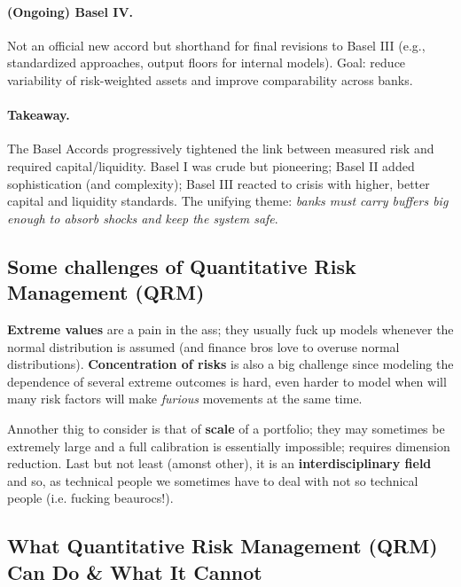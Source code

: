 \paragraph{(Ongoing) Basel IV.}
Not an official new accord but shorthand for final revisions to Basel III (e.g., standardized approaches, output floors for internal models). Goal: reduce variability of risk-weighted assets and improve comparability across banks.

\paragraph{Takeaway.}
The Basel Accords progressively tightened the link between measured risk and required capital/liquidity. Basel I was crude but pioneering; Basel II added sophistication (and complexity); Basel III reacted to crisis with higher, better capital and liquidity standards. The unifying theme: \emph{banks must carry buffers big enough to absorb shocks and keep the system safe}.

\subsection*{Some challenges of Quantitative Risk Management (QRM)}
\textbf{Extreme values} are a pain in the ass; they usually fuck up models whenever the normal distribution is assumed (and finance bros love to overuse normal distributions). 
\textbf{Concentration of risks} is also a big challenge since modeling the dependence of several extreme outcomes is hard, even harder to model when will many risk factors will make
\textit{furious} movements at the same time. 

\vspace{0.2cm}

Annother thig to consider is that of \textbf{scale} of a portfolio; they may sometimes be extremely large and a full calibration is essentially impossible;
requires dimension reduction. Last but not least (amonst other), it is an \textbf{interdisciplinary field} and so, as technical people we sometimes have to deal with not so technical people (i.e. fucking beaurocs!). 

\subsection*{What Quantitative Risk Management (QRM) Can Do \& What It Cannot}

